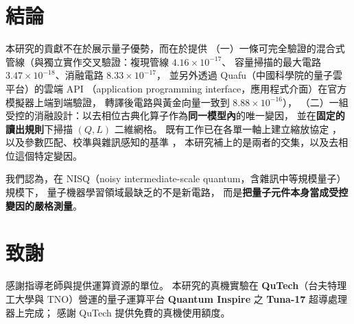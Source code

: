 \documentclass[11pt,a4paper]{ctexart}
\begin{document}
\section{結論}

本研究的貢獻不在於展示量子優勢，而在於提供
（一）一條可完全驗證的混合式管線（與獨立實作交叉驗證：複現管線
\(4.16 \times 10^{- 17}\)、 容量掃描的最大電路
\(3.47 \times 10^{- 18}\)、消融電路 \(8.33 \times 10^{- 17}\)，
並另外透過 Quafu（中國科學院的量子雲平台）的雲端 API （application
programming interface，應用程式介面）在官方模擬器上端到端驗證，
轉譯後電路與黃金向量一致到 \(8.88 \times 10^{- 16}\)），
（二）一組受控的消融設計：以去相位古典化算子作為\textbf{同一模型內}的唯一變因，
並在\textbf{固定的讀出規則}下掃描 \((Q,L)\) 二維網格。
既有工作已在各單一軸上建立縮放協定 \cite{vyskubov2026}，
以及參數匹配、校準與雜訊感知的基準 \cite{gillani2026}，
本研究補上的是兩者的交集，以及去相位這個特定變因。

我們認為，在 NISQ（noisy intermediate-scale
quantum，含雜訊中等規模量子）規模下，
量子機器學習領域最缺乏的不是新電路，
而是\textbf{把量子元件本身當成受控變因的嚴格測量}。

\section{致謝}

感謝指導老師與提供運算資源的單位。 本研究的真機實驗在
\textbf{QuTech}（台夫特理工大學與 TNO）營運的量子運算平台
\textbf{Quantum Inspire} 之 \textbf{Tuna-17} 超導處理器上完成； 感謝
QuTech 提供免費的真機使用額度。


\end{document}
